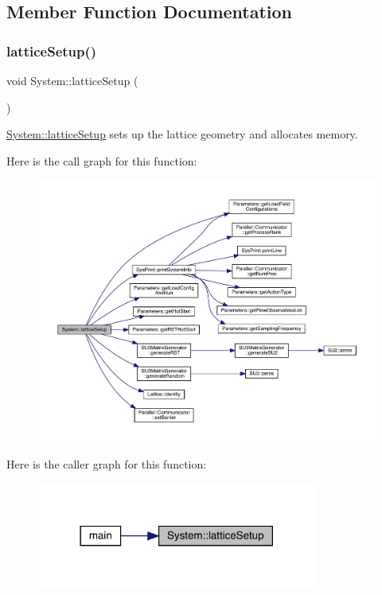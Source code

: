 \subsection{Member Function Documentation}
\mbox{\label{class_system_a93c8a8258ac8f6382ec393bca1271011}} 
\subsubsection{\texorpdfstring{latticeSetup()}{latticeSetup()}}
{\footnotesize\ttfamily void System\+::lattice\+Setup (\begin{DoxyParamCaption}{ }\end{DoxyParamCaption})}



\mbox{\hyperlink{class_system_a93c8a8258ac8f6382ec393bca1271011}{System\+::lattice\+Setup}} sets up the lattice geometry and allocates memory. 

Here is the call graph for this function\+:
\nopagebreak
\begin{figure}[H]
\begin{center}
\leavevmode
\includegraphics[width=350pt]{class_system_a93c8a8258ac8f6382ec393bca1271011_cgraph}
\end{center}
\end{figure}
Here is the caller graph for this function\+:
\nopagebreak
\begin{figure}[H]
\begin{center}
\leavevmode
\includegraphics[width=261pt]{class_system_a93c8a8258ac8f6382ec393bca1271011_icgraph}
\end{center}
\end{figure}
\mbox{\label{class_system_afa39feb75f96798930f4bfb48205f40b}} 
